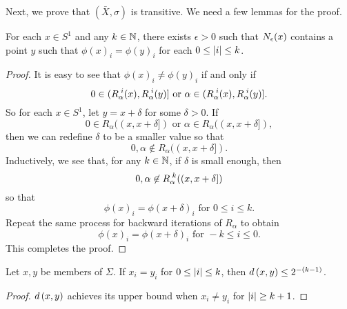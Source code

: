 \documentclass[10pt,twoside,draft]{book}
\begin{document}
\begin{example}
\begin{proposition}
  \end{proposition}
  Next, we prove that $(\bar{X}, \sigma)$ is transitive.
  We need a few lemmas for the proof.
  \begin{lemma}
    For each $x \in S^1$ and any $k \in \mathbb{N}$, there exists $\epsilon > 0$ such that $N_{\epsilon}(x)$ contains a point $y$ such that 
    $\phi(x)_i = \phi(y)_i$ for each $0 \leq \left | i \right | \leq k$.
    \label{lem:sturmian1}
    \begin{proof}
      It is easy to see that $\phi(x)_i \neq \phi(y)_i$ if and only if
      \begin{equation*}
        0 \in (\itr{R_\alpha}{i}(x), \itr{R_\alpha}{i}(y)] \mbox{ or } \alpha \in (\itr{R_\alpha}{i}(x), \itr{R_\alpha}{i}(y)]. %
      \end{equation*}
      So for each $x \in S^1$, let $y = x + \delta$ for some $\delta > 0$.
      If 
      \begin{equation*}
        0 \in R_\alpha((x, x+\delta]) \mbox{ or } \alpha \in R_\alpha((x, x+\delta]), %
      \end{equation*}
      then we can redefine $\delta$ to be a smaller value so that 
      \begin{equation*} 
        0, \alpha \not\in R_\alpha((x, x+\delta]). %
      \end{equation*}
      Inductively, we see that, for any $k \in \mathbb{N}$, if $\delta$ is small enough, then 
      \begin{equation*}
        0, \alpha \not\in \itr{R_\alpha}{k}((x, x+\delta]) %
      \end{equation*}
      so that
      \begin{equation*}
        \phi(x)_i = \phi(x+\delta)_i \mbox{ for } 0 \leq i \leq k.
      \end{equation*}
      Repeat the same process for backward iterations of $R_\alpha$ to obtain
      \begin{equation*}
        \phi(x)_i = \phi(x+\delta)_i \mbox{ for } -k \leq i \leq 0.
      \end{equation*}
      This completes the proof.
    \end{proof}
  \end{lemma}
  \begin{proposition}
    Let $x,y$ be members of $\Sigma$.
    If $x_i = y_i$ for $0 \leq \left | i \right | \leq k$, then $d\left( x,y \right) \leq 2^{-(k-1)}$.
    \label{prop:two-sided}
    \begin{proof}
      $d\left( x,y \right)$ achieves its upper bound when $x_i \neq y_i$ for $\left | i \right | \geq k+1$.

\end{proof}
\end{proposition}
\end{example}
\end{document}
